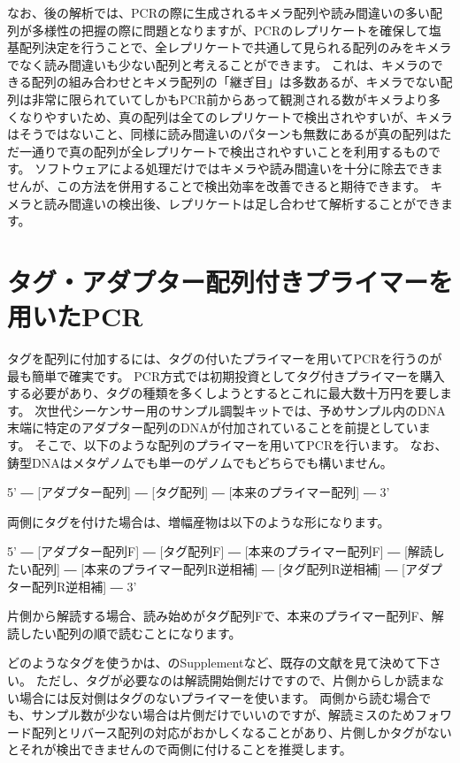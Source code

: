 \documentclass[titlepage,10pt,a4paper]{jsbook}
\newenvironment{pre}{\begin{leftbar}\raggedright\ttfamily\footnotesize\setlength{\baselineskip}{1.4em}}{\end{leftbar}\vspace{-1em}}
\begin{document}
なお、後の解析では、PCRの際に生成されるキメラ配列や読み間違いの多い配列が多様性の把握の際に問題となりますが、PCRのレプリケートを確保して塩基配列決定を行うことで、全レプリケートで共通して見られる配列のみをキメラでなく読み間違いも少ない配列と考えることができます。
これは、キメラのできる配列の組み合わせとキメラ配列の「継ぎ目」は多数あるが、キメラでない配列は非常に限られていてしかもPCR前からあって観測される数がキメラより多くなりやすいため、真の配列は全てのレプリケートで検出されやすいが、キメラはそうではないこと、同様に読み間違いのパターンも無数にあるが真の配列はただ一通りで真の配列が全レプリケートで検出されやすいことを利用するものです。
ソフトウェアによる処理だけではキメラや読み間違いを十分に除去できませんが、この方法を併用することで検出効率を改善できると期待できます。
キメラと読み間違いの検出後、レプリケートは足し合わせて解析することができます。

\section{タグ・アダプター配列付きプライマーを用いたPCR}

タグを配列に付加するには、タグの付いたプライマーを用いてPCRを行うのが最も簡単で確実です。
PCR方式では初期投資としてタグ付きプライマーを購入する必要があり、タグの種類を多くしようとするとこれに最大数十万円を要します。
次世代シーケンサー用のサンプル調製キットでは、予めサンプル内のDNA末端に特定のアダプター配列のDNAが付加されていることを前提としています。
そこで、以下のような配列のプライマーを用いてPCRを行います。
なお、鋳型DNAはメタゲノムでも単一のゲノムでもどちらでも構いません。

\begin{pre}
5' ― [アダプター配列] ― [タグ配列] ― [本来のプライマー配列] ― 3'
\end{pre}

両側にタグを付けた場合は、増幅産物は以下のような形になります。

\begin{pre}
5' ― [アダプター配列F] ― [タグ配列F] ― [本来のプライマー配列F] ― [解読したい配列] ― [本来のプライマー配列R逆相補] ― [タグ配列R逆相補] ― [アダプター配列R逆相補] ― 3'
\end{pre}

片側から解読する場合、読み始めがタグ配列Fで、本来のプライマー配列F、解読したい配列の順で読むことになります。

どのようなタグを使うかは、\citet{Hamady2008}のSupplementなど、既存の文献を見て決めて下さい。
ただし、タグが必要なのは解読開始側だけですので、片側からしか読まない場合には反対側はタグのないプライマーを使います。
両側から読む場合でも、サンプル数が少ない場合は片側だけでいいのですが、解読ミスのためフォワード配列とリバース配列の対応がおかしくなることがあり、片側しかタグがないとそれが検出できませんので両側に付けることを推奨します。
\end{document}
